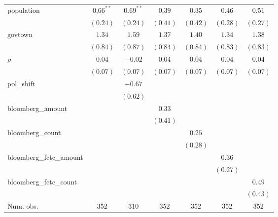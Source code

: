 \begin{table}[!h]
\begin{center}
\begin{tabular}{l c c c c c c }
population              & $0.66^{**}$  & $0.69^{**}$  & $0.39$       & $0.35$       & $0.46$       & $0.51$       \\
                        & $(0.24)$     & $(0.24)$     & $(0.41)$     & $(0.42)$     & $(0.28)$     & $(0.27)$     \\
govtown                 & $1.34$       & $1.59$       & $1.37$       & $1.40$       & $1.34$       & $1.38$       \\
                        & $(0.84)$     & $(0.87)$     & $(0.84)$     & $(0.84)$     & $(0.83)$     & $(0.83)$     \\
$\rho$                  & $0.04$       & $-0.02$      & $0.04$       & $0.04$       & $0.04$       & $0.04$       \\
                        & $(0.07)$     & $(0.07)$     & $(0.07)$     & $(0.07)$     & $(0.07)$     & $(0.07)$     \\
pol\_shift              &              & $-0.67$      &              &              &              &              \\
                        &              & $(0.62)$     &              &              &              &              \\
bloomberg\_amount       &              &              & $0.33$       &              &              &              \\
                        &              &              & $(0.41)$     &              &              &              \\
bloomberg\_count        &              &              &              & $0.25$       &              &              \\
                        &              &              &              & $(0.28)$     &              &              \\
bloomberg\_fctc\_amount &              &              &              &              & $0.36$       &              \\
                        &              &              &              &              & $(0.27)$     &              \\
bloomberg\_fctc\_count  &              &              &              &              &              & $0.49$       \\
                        &              &              &              &              &              & $(0.43)$     \\
\midrule
Num. obs.               & 352          & 310          & 352          & 352          & 352          & 352          \\

\end{tabular}
\end{center}
\end{table}
